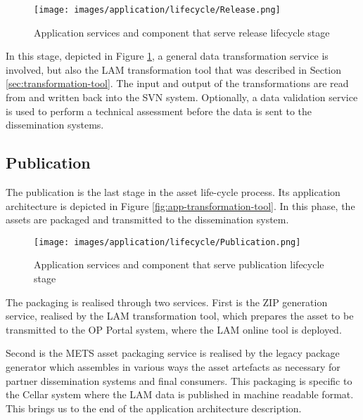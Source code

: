 	 \begin{figure}[!h]
		\centering
		\texttt{[image: images/application/lifecycle/Release.png]}
		\caption{Application services and component that serve release lifecycle stage}
		\label{fig:app-release}
	\end{figure}

	In this stage, depicted in Figure \ref{fig:app-release}, a general data transformation service is involved, but also the LAM transformation tool that was described in Section \ref{sec:transformation-tool}. The input and output of the transformations are read from and written back into the SVN system. Optionally, a data validation service is used to perform a technical assessment before the data is sent to the dissemination systems.
	
	\subsection{Publication}
	\label{sec:publication}
	
	The publication is the last stage in the asset life-cycle process. Its application architecture is depicted in Figure \ref{fig:app-transformation-tool}.
	In this phase, the assets are packaged and transmitted to the dissemination system. 
	
	 \begin{figure}[!h]
		\centering
		\texttt{[image: images/application/lifecycle/Publication.png]}
		\caption{Application services and component that serve publication lifecycle stage}
		\label{fig:app-publication}
	\end{figure}

	The packaging is realised through two services. First is the ZIP generation service, realised by the LAM transformation tool, which prepares the asset to be transmitted to the OP Portal system, where the LAM online tool is deployed. 
	
	\enlargethispage{2em}
	
	Second is the METS\citep{mets} asset packaging service is realised by the legacy package generator which assembles in various ways the asset artefacts as necessary for partner dissemination systems and final consumers. This packaging is specific to the Cellar system where the LAM data is published in machine readable format. This brings us to the end of the application architecture description.
	
